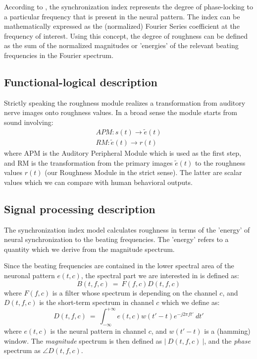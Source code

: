 According to , the synchronization
index represents the degree of phase-locking to a particular
frequency that is present in the neural pattern. The index can be
mathematically expressed as the (normalized) Fourier Series
coefficient at the frequency of interest. Using this concept, the
degree of roughness can be defined as the sum of the normalized
magnitudes or 'energies' of the relevant beating frequencies in
the Fourier spectrum.


\subsection{Functional-logical description}

Strictly speaking the roughness module realizes a transformation
from auditory nerve images onto roughness values. In a broad sense
the module starts from sound involving:
\begin{eqnarray}
    APM: s(t) \rightarrow \tilde{e}(t)\\
    RM: \tilde{e}(t) \rightarrow r(t)
\end{eqnarray}
where APM is the Auditory Peripheral Module which is used as the
first step, and RM is the transformation from the primary images
$\tilde{e}(t)$ to the roughness values $r(t)$ (our Roughness
Module in the strict sense). The latter are scalar values which we
can compare with human behavioral outputs.

\subsection{Signal processing description}

The synchronization index model calculates roughness in terms of
the 'energy' of neural synchronization to the beating
frequencies. The 'energy' refers to a quantity which we derive
from the magnitude spectrum.

Since the beating frequencies are contained in the lower
spectral area of the neuronal pattern $e(t,c)$, the spectral
part we are interested in is defined as:
\begin{equation}
  B(t,f,c) ~=~ F(f,c)D(t,f,c)
\end{equation}
where $F(f,c)$ is a filter whose spectrum is depending on the
channel $c$, and $D(t,f,c)$ is the short-term spectrum in
channel $c$ which we define as:
\begin{equation}\label{E1}
  D(t,f,c)~=~\int_{-\infty}^{+\infty} e(t,c)w(t'-t)e^{-j2\pi
  ft'}~dt'
\end{equation}
where $e(t,c)$ is the neural pattern in channel $c$, and
$w(t'-t)$ is a (hamming) window. The \emph{magnitude} spectrum
is then defined as $\left|~D(t,f,c)~\right|$, and the
\emph{phase} spectrum as $\angle D(t,f,c)$.

